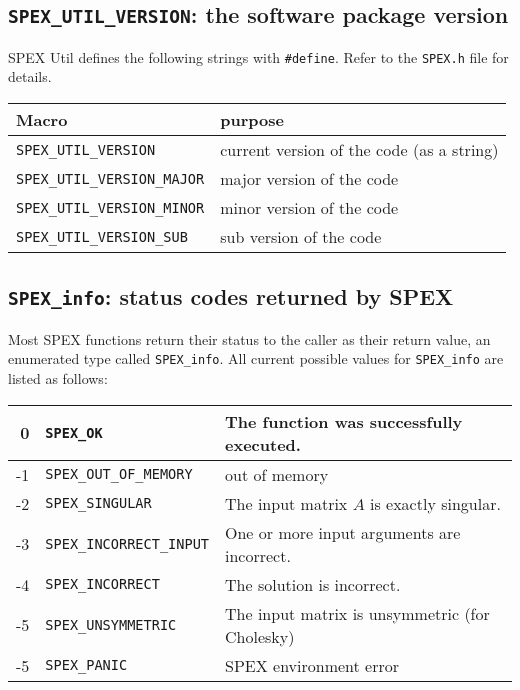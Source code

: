 \documentclass[12pt]{report}
\theoremstyle{definition}
\begin{document}
\cprotect\subsection{\verb|SPEX_UTIL_VERSION|: the software package version}

SPEX Util defines the following strings with \verb|#define|. Refer to
the \verb|SPEX.h| file for details.

\begin{center}
\begin{tabular}{ll}
\hline
Macro & purpose \\
\hline
\verb|SPEX_UTIL_VERSION|       & current version of the code (as a string)\\
\verb|SPEX_UTIL_VERSION_MAJOR| & major version of the code\\
\verb|SPEX_UTIL_VERSION_MINOR| & minor version of the code   \\
\verb|SPEX_UTIL_VERSION_SUB|   & sub version of the code\\
\hline
\end{tabular}
\end{center}

\cprotect\subsection{\verb|SPEX_info|: status codes returned by SPEX}
\label{ss:SPEX_info}

Most SPEX functions return their status to the caller as their return value,
an enumerated type called \verb|SPEX_info|. All current possible values for
\verb|SPEX_info| are listed as follows:

\begin{center}
\begin{tabular}{rll}
\hline
    0& \verb|SPEX_OK|& The function was successfully executed.\\
\hline
    -1& \verb|SPEX_OUT_OF_MEMORY|& out of memory\\
\hline
    -2& \verb|SPEX_SINGULAR|& The input matrix $A$ is exactly singular.\\
\hline
    -3& \verb|SPEX_INCORRECT_INPUT|& One or more input arguments are incorrect.\\
\hline
    -4& \verb|SPEX_INCORRECT|& The solution is incorrect.\\
\hline
    -5& \verb|SPEX_UNSYMMETRIC|& The input matrix is unsymmetric (for Cholesky)\\
\hline
    -5& \verb|SPEX_PANIC| & SPEX environment error \\
\hline
\end{tabular}
\end{center}
\end{document}
